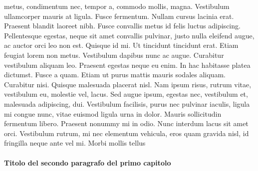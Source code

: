 metus, condimentum nec, tempor a, commodo mollis, magna. Vestibulum ullamcorper mauris at ligula. Fusce fermentum. Nullam cursus lacinia erat. Praesent blandit laoreet nibh. Fusce convallis metus id felis luctus adipiscing. Pellentesque egestas, neque sit amet convallis pulvinar, justo nulla eleifend augue, ac auctor orci leo non est. Quisque id mi. Ut tincidunt tincidunt erat. Etiam feugiat lorem non metus. Vestibulum dapibus nunc ac augue. Curabitur vestibulum aliquam leo. Praesent egestas neque eu enim. In hac habitasse platea dictumst. Fusce a quam. Etiam ut purus mattis mauris sodales aliquam. Curabitur nisi. Quisque malesuada placerat nisl. Nam ipsum risus, rutrum vitae, vestibulum eu, molestie vel, lacus. Sed augue ipsum, egestas nec, vestibulum et, malesuada adipiscing, dui. Vestibulum facilisis, purus nec pulvinar iaculis, ligula mi congue nunc, vitae euismod ligula urna in dolor. Mauris sollicitudin fermentum libero. Praesent nonummy mi in odio. Nunc interdum lacus sit amet orci. Vestibulum rutrum, mi nec elementum vehicula, eros quam gravida nisl, id fringilla neque ante vel mi. Morbi mollis tellus

\paragraph{Titolo del secondo paragrafo del primo capitolo}

